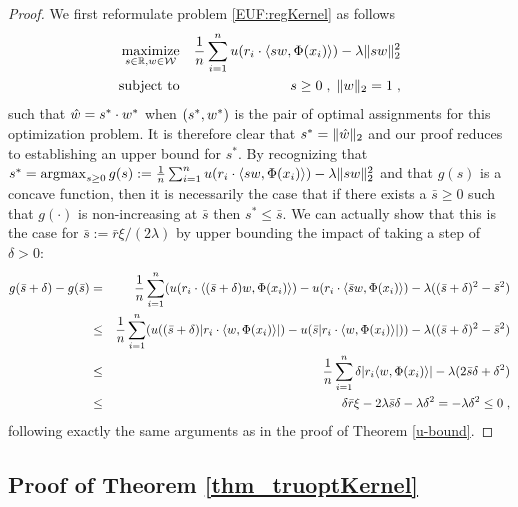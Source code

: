 \documentclass[]{interact}
\theoremstyle{plain}%
\theoremstyle{definition}
\theoremstyle{remark}
\def\maximize{\mathop{\rm maximize}}
\def\subto{{\rm subject \mbox{   }\rm to}}
\def\argmax{\mathop{\rm argmax}}
\newcommand{\0}{\V{0}}
\newcommand{\1}{\V{1}}
\renewcommand{\Re}{\mathbb{R}}
\newcommand{\modified}[1]{{\color{blue} #1}}
\theoremstyle{plain}
\theoremstyle{definition}
\begin{document}
\begin{proof}
We first reformulate problem
  \eqref{EUF:regKernel} as follows
  \begin{eqnarray*}
 \maximize_{s\in\Re, \kq\in\kQ}&&\frac{1}{n}\sum_{i=1}^n u(r_i \cdot \langle s\kq, \Phi(x_i)\rangle) - \lambda \|s\kq\|_2^2\\
    \subto&& s\geq0\;,\;\|\kq\|_2=1\;,
  \end{eqnarray*}
 such that ${\hat{w}} =s^*\cdot{w}^*$ when $(s^*,{w}^*)$ is the pair of optimal
  assignments for this optimization problem. It is therefore clear that
  $s^*=\|{\hat{w}}\|_2$ and our proof reduces to establishing an upper bound for $s^*$.
  By recognizing that
  $s^*=\argmax_{s\geq 0} g(s):=\frac{1}{n}\sum_{i=1}^n u(r_i \cdot \langle s\kq, \Phi(x_i)\rangle) - \lambda \|s\kq\|_2^2$
  and that $g(s)$ is a concave function, then it is necessarily the case that if there
  exists a $\bar{s}\geq 0$ such that $g(\cdot)$ is non-increasing at $\bar{s}$ then
  $s^* \leq \bar{s}$. We can actually show that this is the case for
  $\bar{s}:= \bar{r}\xi/(2\lambda)$ by upper bounding the impact of taking a step of
  $\delta>0$:
  \begin{eqnarray*}
    g(\bar{s}+\delta)-g(\bar{s}) &=& \frac{1}{n}\sum_{i=1}^n (u(r_i \cdot \langle (\bar{s}+\delta) {w}, \Phi(x_i)\rangle ) - u(r_i \cdot \langle \bar{s}{w}, \Phi(x_i)\rangle) - \lambda ((\bar{s}+\delta)^2-\bar{s}^2)\\
                                 &\leq& \frac{1}{n}\sum_{i=1}^n (u((\bar{s}+\delta) |r_i \cdot \langle {w}, \Phi(x_i)\rangle|) - u(\bar{s} |r_i \cdot \langle {w}, \Phi(x_i)\rangle|) ) - \lambda ((\bar{s}+\delta)^2-\bar{s}^2)\\
                                 &\leq & \frac{1}{n}\sum_{i=1}^n  \delta |r_i \langle {w}, \Phi(x_i)\rangle | - \lambda (2\bar{s}\delta + \delta^2)\\
                                 &\leq &  \delta \bar{r} \xi  - 2\lambda \bar{s}\delta -  \lambda \delta^2 = -\lambda   \delta^2 \leq 0\;,
  \end{eqnarray*}
  following exactly the same arguments as in the proof of Theorem \ref{u-bound}.
\end{proof}


\subsection{\modified{Proof of Theorem \ref{thm_truoptKernel}}}\label{app:proof:thm_truoptKernel}
\end{document}
